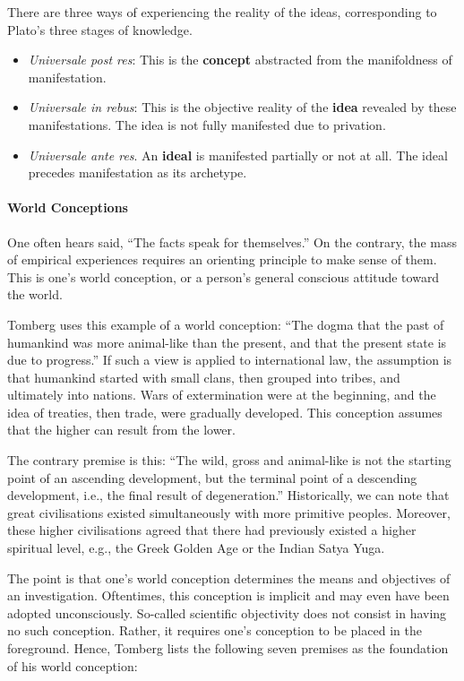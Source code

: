 There are three ways of experiencing the reality of the ideas, corresponding to Plato's three stages of knowledge.

\begin{itemize}


\item \emph{Universale post res}: This is the \textbf{concept} abstracted from the manifoldness of manifestation.

\item \emph{Universale in rebus}: This is the objective reality of the \textbf{idea} revealed by these manifestations. The idea is not fully manifested due to privation.

\item \emph{Universale ante res}. An \textbf{ideal} is manifested partially or not at all. The ideal precedes manifestation as its archetype.
\end{itemize}


\paragraph{World Conceptions}


One often hears said, ``The facts speak for themselves.'' On the contrary, the mass of empirical experiences requires an orienting principle to make sense of them. This is one's world conception, or a person's general conscious attitude toward the world.

Tomberg uses this example of a world conception: ``The dogma that the past of humankind was more animal-like than the present, and that the present state is due to progress.'' If such a view is applied to international law, the assumption is that humankind started with small clans, then grouped into tribes, and ultimately into nations. Wars of extermination were at the beginning, and the idea of treaties, then trade, were gradually developed. This conception assumes that the higher can result from the lower.

The contrary premise is this: ``The wild, gross and animal-like is not the starting point of an ascending development, but the terminal point of a descending development, i.e., the final result of degeneration.'' Historically, we can note that great civilisations existed simultaneously with more primitive peoples. Moreover, these higher civilisations agreed that there had previously existed a higher spiritual level, e.g., the Greek Golden Age or the Indian Satya Yuga.

The point is that one's world conception determines the means and objectives of an investigation. Oftentimes, this conception is implicit and may even have been adopted unconsciously. So-called scientific objectivity does not consist in having no such conception. Rather, it requires one's conception to be placed in the foreground. Hence, Tomberg lists the following seven premises as the foundation of his world conception:

